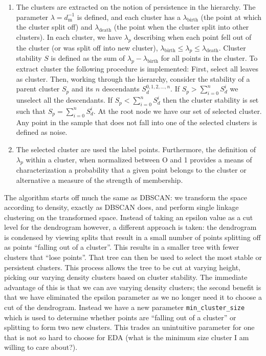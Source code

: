 \documentclass[fleqn,usenatbib]{mnras}
\begin{document}
\begin{enumerate}
\item The clusters are extracted on the notion of persistence in the hierarchy.
  The parameter $\lambda = d_{\mathrm{m}}^{-1}$ is defined, and each cluster has a
  $\lambda_{\mathrm{birth}}$ (the point at which the cluster split off) and
  $\lambda_{\mathrm{death}}$ (the point when the cluster split into other clusters).
  In each cluster, we have $\lambda_p$ describing when each point fell out of the
  cluster (or was split off into new cluster), $\lambda_{\mathrm{birth}} \leq \lambda_{p} \leq \lambda_{\mathrm{death}}$.
  Cluster stability  $S$ is defined as the sum of $\lambda_{p} - \lambda_{\mathrm{birth}}$
  for all points in the cluster. To extract cluster the following procedure is
  implemented: First, select all leaves as cluster. Then, working through the
  hierarchy, consider the stability of a parent cluster $S_p$ and its $n$ descendants
  $S_d^{0,1,2,...,n}$. If $S_p > \sum_{i=0}^{n} S_d^i$ we unselect all the descendants.
  If $S_p < \sum_{i=0}^{n} S_d^i$ then the cluster stability is set such that
  $S_p = \sum_{i=0}^{n} S_d^i$. At the root node we have our set of selected 
  cluster. Any point in the sample that does not fall into one of the selected
  clusters is defined as noise.

\item The selected cluster are used the label points. Furthermore, the definition
  of $\lambda_p$ within a cluster, when normalized between O and 1 provides a means
  of characterization a probability that a given point belongs to the cluster or
  alternative a measure of the strength of membership. 
  
\end{enumerate}

The algorithm starts off much the same as DBSCAN: we transform the space
according to density, exactly as DBSCAN does, and perform single linkage
clustering on the transformed space. Instead of taking an epsilon value
as a cut level for the dendrogram however, a different approach is taken:
the dendrogram is condensed by viewing splits that result in a small number
of points splitting off as points ``falling out of a cluster''. This results
in a smaller tree with fewer clusters that ``lose points''. That tree can then
be used to select the most stable or persistent clusters. This process allows
the tree to be cut at varying height, picking our varying density clusters
based on cluster stability. The immediate advantage of this is that we can
ave varying density clusters; the second benefit is that we have eliminated
the epsilon parameter as we no longer need it to choose a cut of the dendrogram.
Instead we have a new parameter \texttt{min\_cluster\_size} which is used
to determine whether points are ``falling out of a cluster'' or splitting
to form two new clusters. This trades an unintuitive parameter for one that
is not so hard to choose for EDA (what is the minimum size cluster I am
willing to care about?).
\end{document}
